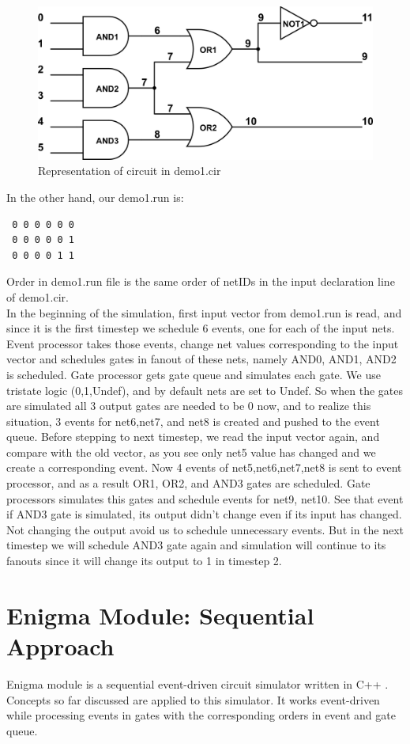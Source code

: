 \documentclass[a4paper,onesided,12pt]{report}
\begin{document}
  \begin{figure}[htbp]
  		\centering
  		\includegraphics[height=0.25\textheight]{senior_demo.png}
  		\caption{Representation of circuit in demo1.cir}
  \end{figure}
 In the other hand, our demo1.run is:
 \begin{verbatim}
 0 0 0 0 0 0
 0 0 0 0 0 1
 0 0 0 0 1 1
 \end{verbatim}
 Order in demo1.run file is the same order of netIDs in the input declaration line of demo1.cir. \\
 In the beginning of the simulation, first input vector from demo1.run is read, and since it is the first timestep we schedule 6 events, one for each of the input nets. Event processor takes those events, change net values corresponding to the input vector and schedules gates in fanout of these nets, namely AND0, AND1, AND2 is scheduled. Gate processor gets gate queue and simulates each gate. We use tristate logic (0,1,Undef), and by default nets are set to Undef. So when the gates are simulated all 3 output gates are needed to be 0 now, and to realize this situation, 3 events for net6,net7, and net8 is created and pushed to the event queue. Before stepping to next timestep, we read the input vector again, and compare with the old vector, as you see only net5 value has changed and we create a corresponding event. Now 4 events of net5,net6,net7,net8 is sent to event processor, and as a result OR1, OR2, and AND3 gates are scheduled. Gate processors simulates this gates and schedule events for net9, net10. See that event if AND3 gate is simulated, its output didn't change even if its input has changed. Not changing the output avoid us to schedule unnecessary events.  But in the next timestep we will schedule AND3 gate again and simulation will continue to its fanouts since it will change its output to 1 in timestep 2.
 
\section{Enigma Module: Sequential Approach}
Enigma module is a sequential event-driven circuit simulator written in C++ . Concepts so far discussed are applied to this simulator. It works event-driven while processing events in gates with the corresponding orders in event and gate queue.
\end{document}
